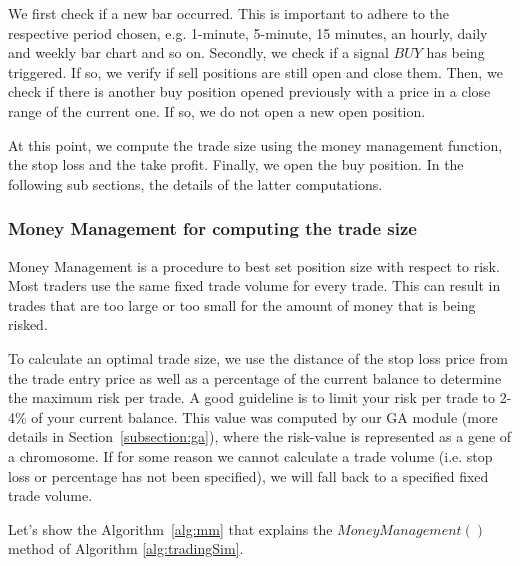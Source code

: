 We first check if a new bar occurred. This is important to adhere to the respective period chosen, e.g. 1-minute,  5-minute, 15 minutes, an hourly, daily and weekly bar chart and so on.
Secondly, we check if a signal $BUY$ has being triggered. If so, we verify if sell positions are still open and close them. Then, we check if there is another buy position opened previously with a price in a close range of the current one. If so, we do not open a new open position.

\noindent At this point, we compute the trade size using the money management function, the stop loss and the take profit. Finally, we open the buy position. In the following sub sections, the details of the latter computations. 

\subsubsection{Money Management for computing the trade size}
Money Management is a procedure to best set position size with respect to risk. Most traders use the same fixed trade volume for every trade. This can result in trades that are too large or too small for the amount of money that is being risked.

To calculate an optimal trade size, we use the distance of the stop loss price from the trade entry price as well as a percentage of the current balance to determine the maximum risk per trade. A good guideline is to limit your risk per trade to 2-4\% of your current balance. This value was computed by our GA module (more details in Section~\ref{subsection:ga}), where the risk-value is represented as a gene of a chromosome. If for some reason we cannot calculate a trade volume (i.e. stop loss or percentage has not been specified), we will fall back to a specified fixed trade volume.

Let's show the Algorithm~\ref{alg:mm} that explains the $MoneyManagement()$ method of Algorithm \ref{alg:tradingSim}. 

